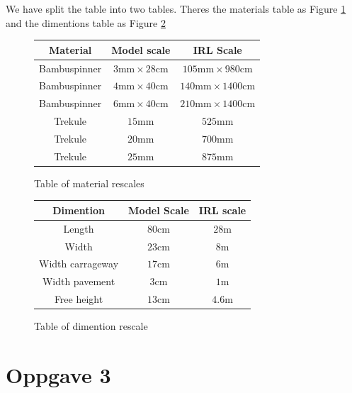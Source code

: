 \documentclass{report}
\begin{document}
We have split the table into two tables. Theres the materials table as Figure \ref{fig:tomr} and the dimentions table as Figure \ref{fig:todr}

\begin{figure}[H]
	\centering
	\begin{tabular}{c|c|c}
		Material     & Model scale                          & IRL Scale                                \\
		\hline
		Bambuspinner & $3\mathrm{mm} \times 28 \mathrm{cm}$ & $105\mathrm{mm} \times 980 \mathrm{cm}$  \\
		Bambuspinner & $4\mathrm{mm} \times 40 \mathrm{cm}$ & $140\mathrm{mm} \times 1400 \mathrm{cm}$ \\
		Bambuspinner & $6\mathrm{mm} \times 40 \mathrm{cm}$ & $210\mathrm{mm} \times 1400 \mathrm{cm}$ \\
		Trekule      & $15\mathrm{mm}$                      & $525\mathrm{mm}$                         \\
		Trekule      & $20\mathrm{mm}$                      & $700\mathrm{mm}$                         \\
		Trekule      & $25\mathrm{mm}$                      & $875\mathrm{mm}$                         \\
	\end{tabular}
	\caption{Table of material rescales}
	\label{fig:tomr}
\end{figure}

\begin{figure}[H]
	\centering

	\begin{tabular}{c|c|c}
		Dimention        & Model Scale      & IRL scale      \\
		\hline
		Length           & $80 \mathrm{cm}$ & $28 \mathrm m$ \\
		Width            & $23 \mathrm{cm}$ & $8\mathrm m$   \\
		Width carrageway & $17 \mathrm{cm}$ & $6\mathrm m$   \\
		Width pavement   & $3  \mathrm{cm}$ & $1\mathrm m$   \\
		Free height      & $13 \mathrm{cm}$ & $4.6\mathrm m$ \\
	\end{tabular}

	\caption{Table of dimention rescale}
	\label{fig:todr}
\end{figure}

\section{Oppgave 3}
\end{document}
